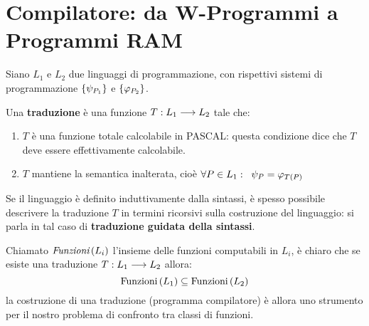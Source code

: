 \documentclass{lectures}
\begin{document}
\section{Compilatore: da W-Programmi a Programmi RAM}
\begin{multicols}{2}
\begin{definition}[Traduzione]
    Siano \(L_1\) e \(L_2\) due linguaggi di programmazione, con rispettivi sistemi di programmazione \(\left\{\psi_{P_1}\right\}\) e \(\left\{\varphi_{P_2}\right\}\).
    
    Una \textbf{traduzione} è una funzione \(T:L_1\longrightarrow L_2\) tale che:
    \begin{enumerate}
        \item \(T\) è una funzione totale calcolabile in PASCAL: questa condizione dice che \(T\) deve essere effettivamente calcolabile.
        \item \(T\) mantiene la semantica inalterata, cioè \(\forall P \in L_1: \;\; \psi_P = \varphi_{T\left(P\right)}\)
    \end{enumerate}
\end{definition}
\begin{definition}
    Se il linguaggio è definito induttivamente dalla sintassi, è spesso possibile descrivere la traduzione \(T\) in termini ricorsivi sulla costruzione del linguaggio: si parla in tal caso di \textbf{traduzione guidata della sintassi}.
\end{definition}
\begin{observation}
    Chiamato \(\textit{Funzioni}\left(L_i\right)\) l'insieme delle funzioni computabili in \(L_i\), è chiaro che se esiste una traduzione \(T:L_1\longrightarrow L_2\) allora:
    \[
        \text{Funzioni}\left(L_1\right) \subseteq \text{Funzioni}\left(L_2\right)
    \]
    la costruzione di una traduzione (programma compilatore) è allora uno strumento per il nostro problema di confronto tra classi di funzioni.
\end{observation}
\end{multicols}
\end{document}
